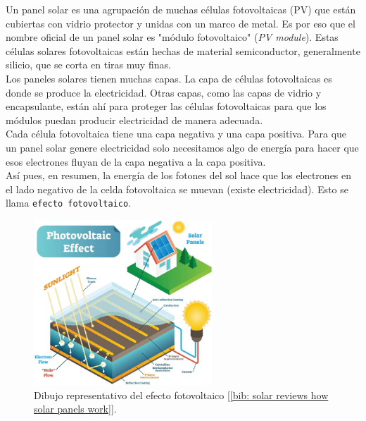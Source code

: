 \documentclass[12pt]{article}
\begin{document}
	\pagebreak
	
	\noindent Un panel solar es una agrupación de muchas células fotovoltaicas (PV) que están cubiertas con vidrio protector y unidas con un marco de metal. Es por eso que el nombre oficial de un panel solar es "módulo fotovoltaico" (\textit{PV module}). Estas células solares fotovoltaicas están hechas de material semiconductor, generalmente silicio, que se corta en tiras muy finas.\\
	
	\noindent Los paneles solares tienen muchas capas. La capa de células fotovoltaicas es donde se produce la electricidad. Otras capas, como las capas de vidrio y encapsulante, están ahí para proteger las células fotovoltaicas para que los módulos puedan producir electricidad de manera adecuada.\\
	
	\noindent Cada célula fotovoltaica tiene una capa negativa y una capa positiva. Para que un panel solar genere electricidad solo necesitamos algo de energía para hacer que esos electrones fluyan de la capa negativa a la capa positiva. \\
	
	\noindent Así pues, en resumen, la energía de los fotones del sol hace que los electrones en el lado negativo de la celda fotovoltaica se muevan (existe electricidad). Esto se llama \texttt{efecto fotovoltaico}.\\
	
	\begin{figure}[h]
		\begin{center}
			\includegraphics[width=0.6\textwidth]{img/photovoltaic_effect.png}
			\caption{Dibujo representativo del efecto fotovoltaico [\ref{bib: solar reviews how solar panels work}].}
			\label{fig: efecto fotovoltaico}
		\end{center}
	\end{figure}
	
\end{document}
